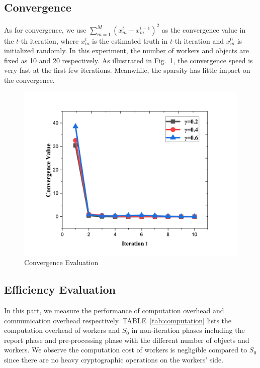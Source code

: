 \documentclass[conference]{IEEEtran}
\begin{document}
\subsection{Convergence}
As for convergence, we use $\sum_{m=1}^M (x_m^t - x_m^{t-1})^2$ as the convergence value in the $t$-th iteration, where $x_m^t$ is the estimated truth in $t$-th iteration and $x_m^0$ is initialized randomly.
In this experiment, the number of workers and objects are fixed as 10 and 20 respectively.
As illustrated in Fig.~\ref{fig:conver}, the convergence speed is very fast at the first few iterations.
Meanwhile, the sparsity has little impact on the convergence.
\begin{figure}[htbp]
  \centering
  \includegraphics[width=0.60\linewidth]{figures/conver.pdf}
  \caption{Convergence Evaluation}
  \label{fig:conver}
\end{figure}

\subsection{Efficiency Evaluation}
In this part, we measure the performance of computation overhead and communication overhead respectively.
TABLE~\ref{tab:computation} lists the computation overhead of workers and $S_0$ in non-iteration phases including the report phase and pre-processing phase with the different number of objects and workers.
We observe the computation cost of workers is negligible compared to $S_0$ since there are no heavy cryptographic operations on the workers' side.
\end{document}
